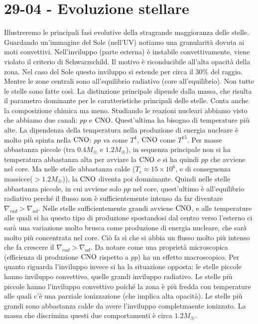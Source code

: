 \section*{29-04 - Evoluzione stellare}
Illustreremo le principali fasi evolutive della stragrande maggioranza delle stelle. \\
Guardando un'immagine del Sole (nell'UV) notiamo una granularità dovuta ai moti convettivi. Nell'inviluppo (parte esterna) è instabile convettivamente, viene violato il criterio di Schwarzschild. Il motivo è riconducibile all'alta opacità della zona. Nel caso del Sole questo inviluppo si estende per circa il $30\%$ del raggio. Mentre le zone centrali sono all'equilibrio radiativo (core all'equilibrio). Non tutte le stelle sono fatte così. La distinzione principale dipende dalla massa, che risulta il parametro dominante per le caratteristiche principali delle stelle. Conta anche la composizione chimica ma meno. Studiando le reazioni nucleari abbiamo visto che abbiamo due canali: $pp$ e $\ce{CNO}$. Quest'ultima ha bisogno di temperature più alte. La dipendenza della temperatura nella produzione di energia nucleare è molto più spinta nella $\ce{CNO}$: $pp$ va come $T^4$, $\ce{CNO}$ come $T^{15}$. Per masse abbastanza piccole (tra $0.4M_{\astrosun}$ e $1.2M_{\astrosun}$), in sequenza principale non si ha temperatura abbastanza alta per avviare la $\ce{CNO}$ e si ha quindi $pp$ che avviene nel core. Ma nelle stelle abbastanza calde ($T_c\approx 15\times10^6$, e di conseguenza massicce($>1.2M_{\astrosun}$)), la $\ce{CNO}$ diventa poi domninante. Quindi nelle stelle abbastanza piccole, in cui avviene solo $pp$ nel core, quest'ultimo è all'equilibrio radiativo perché il flusso non è sufficientemente intenso da far diventare $\nabla_{rad} > \nabla_{ad}$. Nelle stelle sufficientemente grandi avviene $\ce{CNO}$, e alle temperature alle quali si ha questo tipo di produzione spostandosi dal centro verso l'esterno ci sarà una variazione molto brusca come produzione di energia nucleare, che sarà molto più concentrata nel core. Ciò fa sì che si abbia un flusso molto più intenso che fa crescere il $\nabla_{rad} > \nabla_{ad}$. Da notare come una proprietà microscopica (efficienza di produzione $\ce{CNO}$ rispetto a $pp$) ha un effetto macroscopico. Per quanto riguarda l'inviluppo invece si ha la situazione opposta: le stelle piccole hanno inviluppo convettivo, quelle grandi inviluppo radiativo. Le stelle più piccole hanno l'inviluppo convettivo poiché la zona è più fredda con temperature alle quali c'è una parziale ionizzazione (che implica alta opacità). Le stelle più grandi sono abbastanza calde da avere l'inviluppo completmaente ionizzato. La massa che discrimina questi due comportamenti è circa $1.2M_{\astrosun}$. \\
